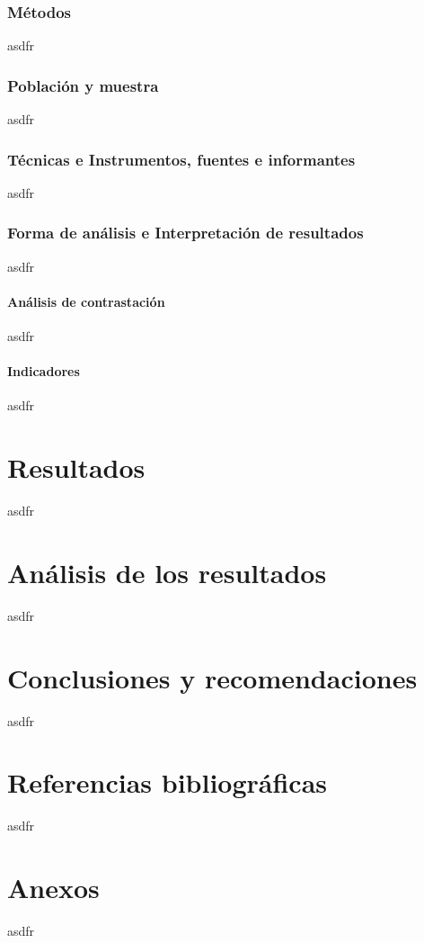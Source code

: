 \documentclass{report}
\begin{document}
\subsection{Métodos}
asdfr
\subsection{Población y muestra}
asdfr
\subsection{Técnicas e Instrumentos, fuentes e informantes}
asdfr
\subsection{Forma de análisis e Interpretación de resultados}
asdfr
\subsubsection{Análisis de contrastación}
asdfr
\subsubsection{Indicadores}
asdfr
\chapter{Resultados}
asdfr
\chapter{Análisis de los resultados}
asdfr
\chapter{Conclusiones y recomendaciones}
asdfr
\chapter{Referencias bibliográficas}
asdfr
\chapter{Anexos}
asdfr
\end{document}
